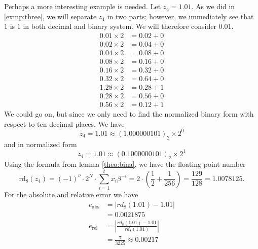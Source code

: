 \begin{exmp}
    Perhaps a more interesting example is needed. Let \(z_4 = 1.01\). As we did in \ref{exmp:three}, we will separate \(z_4\) in two parts; however, we immediately see that \(1\) is \(1\) in both decimal and binary system. We will therefore consider \(0.01\).
    \begin{align*}
        0.01 \times 2 &= 0.02 + 0 \\
        0.02 \times 2 &= 0.04 + 0 \\
        0.04 \times 2 &= 0.08 + 0 \\
        0.08 \times 2 &= 0.16 + 0 \\
        0.16 \times 2 &= 0.32 + 0 \\
        0.32 \times 2 &= 0.64 + 0 \\
        1.28 \times 2 &= 0.28 + 1 \\
        0.28 \times 2 &= 0.56 + 0 \\
        0.56 \times 2 &= 0.12 + 1
    \end{align*}
    We could go on, but since we only need to find the normalized binary form with respect to ten decimal places. We have
    \begin{equation*}
        z_4 = 1.01 \approx (1.000000101)_2 \times 2^0
    \end{equation*}
    and in normalized form
    \begin{equation*}
        z_4 = 1.01 \approx (0.1000000101)_2 \times 2^1
    \end{equation*}
    Using the formula from lemma \ref{theo:bina}, we have the floating point number
    \begin{equation*}
        \text{rd}_8(z_4) = (-1)^{\nu} \cdot 2^N \cdot \sum_{i=1}^{t}x_i \beta^{-i} = 2 \cdot \left(\frac{1}{2} + \frac{1}{256}\right) = \frac{129}{128} = 1.0078125 \text{.}
    \end{equation*}
    For the absolute and relative error we have
    \begin{align*}
        e_\text{abs} &= \left| {rd}_8(1.01) - 1.01 \right| \\
        &= 0.0021875 \\
        e_\text{rel} &= \left| \frac{{rd}_8(1.01) - 1.01}{{rd}_8(1.01)} \right| \\
        &= \frac{7}{3225} \approx 0.00217
    \end{align*}
\end{exmp}
%
